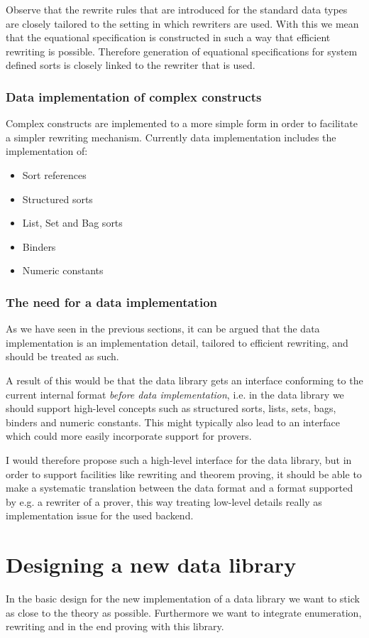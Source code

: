 \documentclass[a4paper,11pt]{article}
\begin{document}
Observe that the rewrite rules that are introduced for the standard data types are closely tailored to the setting in which rewriters are used. With this we mean that the equational specification is constructed in such a way that efficient rewriting is possible. Therefore generation of equational specifications for system defined sorts is closely linked to the rewriter that is used.

\subsubsection{Data implementation of complex constructs}
Complex constructs are implemented to a more simple form in order to facilitate a simpler rewriting mechanism. Currently data implementation includes the implementation of:
\begin{itemize}
 \item Sort references
 \item Structured sorts
 \item List, Set and Bag sorts
 \item Binders
 \item Numeric constants
\end{itemize}

\subsubsection{The need for a data implementation}
As we have seen in the previous sections, it can be argued that the data implementation is an implementation detail, tailored to efficient rewriting, and should be treated as such.

A result of this would be that the data library gets an interface conforming to the current internal format \emph{before data implementation}, i.e. in the data library we should support high-level concepts such as structured sorts, lists, sets, bags, binders and numeric constants. This might typically also lead to an interface which could more easily incorporate support for provers.

I would therefore propose such a high-level interface for the data library, but in order to support facilities like rewriting and theorem proving, it should be able to make a systematic translation between the data format and a format supported by e.g. a rewriter of a prover, this way treating low-level details really as implementation issue for the used backend.

\section{Designing a new data library}
In the basic design for the new implementation of a data library we want to stick as close to the theory as possible. Furthermore we want to integrate enumeration, rewriting and in the end proving with this library.
\end{document}
